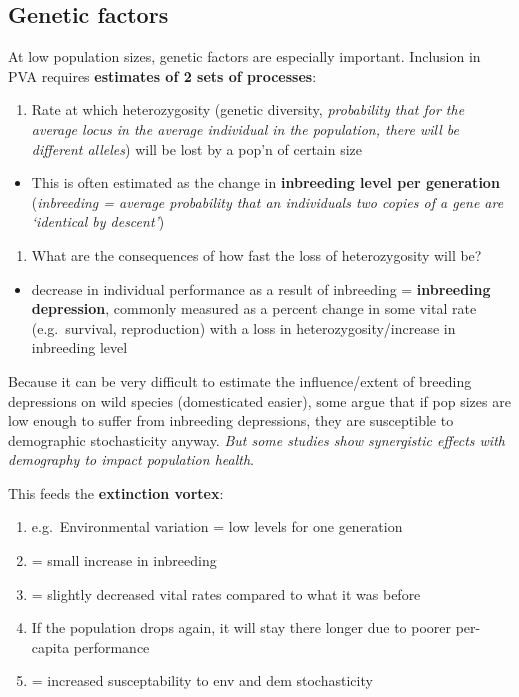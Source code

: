 \documentclass[]{article}
\providecommand{\tightlist}{%
  \setlength{\itemsep}{0pt}\setlength{\parskip}{0pt}}
\begin{document}
\subsection{Genetic factors}\label{genetic-factors}

At low population sizes, genetic factors are especially important.
Inclusion in PVA requires \textbf{estimates of 2 sets of processes}:

\begin{enumerate}
\def\labelenumi{\arabic{enumi}.}
\tightlist
\item
  Rate at which heterozygosity (genetic diversity, \emph{probability
  that for the average locus in the average individual in the
  population, there will be different alleles}) will be lost by a pop'n
  of certain size
\end{enumerate}

\begin{itemize}
\tightlist
\item
  This is often estimated as the change in \textbf{inbreeding level per
  generation} (\emph{inbreeding = average probability that an
  individuals two copies of a gene are `identical by descent'})
\end{itemize}

\begin{enumerate}
\def\labelenumi{\arabic{enumi}.}
\setcounter{enumi}{1}
\tightlist
\item
  What are the consequences of how fast the loss of heterozygosity will
  be?
\end{enumerate}

\begin{itemize}
\tightlist
\item
  decrease in individual performance as a result of inbreeding =
  \textbf{inbreeding depression}, commonly measured as a percent change
  in some vital rate (e.g.~survival, reproduction) with a loss in
  heterozygosity/increase in inbreeding level
\end{itemize}

Because it can be very difficult to estimate the influence/extent of
breeding depressions on wild species (domesticated easier), some argue
that if pop sizes are low enough to suffer from inbreeding depressions,
they are susceptible to demographic stochasticity anyway. \emph{But some
studies show synergistic effects with demography to impact population
health}.

This feeds the \textbf{extinction vortex}:

\begin{enumerate}
\def\labelenumi{\arabic{enumi}.}
\tightlist
\item
  e.g.~Environmental variation = low levels for one generation
\item
  = small increase in inbreeding
\item
  = slightly decreased vital rates compared to what it was before
\item
  If the population drops again, it will stay there longer due to poorer
  per-capita performance
\item
  = increased susceptability to env and dem stochasticity
\end{enumerate}
\end{document}
